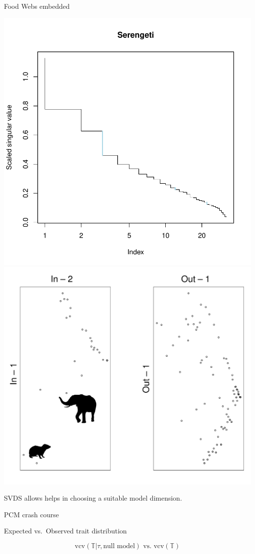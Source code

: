 \documentclass[]{beamer}
\begin{document}
\begin{frame}{Food Webs embedded}

\centering
  \includegraphics[width=0.4\linewidth]{images/Serengeti_svds.pdf}
  \includegraphics[width=0.6\linewidth]{images/Serengeti_Traits.pdf}

\centering
{\tiny SVDS allows helps in choosing a suitable model dimension.}
 
\end{frame}

\begin{frame}{PCM crash course}

\centering
Expected vs.~Observed trait distribution

  \begin{equation*}
    \textrm{vcv}\left(  \mathbb{T} | \tau, \mbox{null model} \right) \mbox{ vs. } \textrm{vcv}\left( \mathbb{T}\right)
  \end{equation*}

\end{frame}
\end{document}
